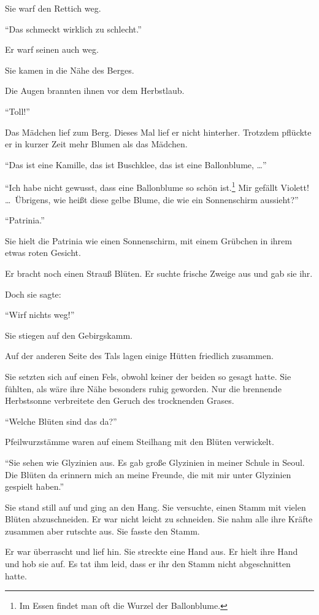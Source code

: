 \documentclass[prd,a4paper,12pt,tightenlines,notitlepage,nofootinbib]{revtex4-1}
\begin{document}
Sie warf den Rettich weg.

"`Das schmeckt wirklich zu schlecht."'

Er warf seinen auch weg.

Sie kamen in die Nähe des Berges.

Die Augen brannten ihnen vor dem Herbstlaub.

"`Toll!"'

Das Mädchen lief zum Berg.  Dieses Mal lief er nicht hinterher.
Trotzdem pflückte er in kurzer Zeit mehr Blumen als das Mädchen.

"`Das ist eine Kamille, das ist Buschklee, das ist eine Ballonblume, \ldots"'

"`Ich habe nicht gewusst, dass eine Ballonblume so schön ist.\footnote{
Im Essen findet man oft die Wurzel der Ballonblume.}
Mir gefällt
Violett!  \ldots\  Übrigens, wie heißt diese gelbe Blume, die wie ein
Sonnenschirm aussieht?"'

"`Patrinia."'

Sie hielt die Patrinia wie einen
Sonnenschirm, mit einem Grübchen in ihrem etwas roten Gesicht.

Er bracht noch einen Strauß Blüten.  Er suchte frische Zweige aus und
gab sie ihr.

Doch sie sagte:

"`Wirf nichts weg!"'

Sie stiegen auf den Gebirgskamm.

Auf der anderen Seite des Tals lagen einige Hütten
friedlich zusammen.

Sie setzten sich auf einen Fels, obwohl keiner der beiden
so gesagt hatte.
Sie fühlten, als wäre ihre Nähe besonders ruhig geworden.
Nur die
brennende Herbstsonne verbreitete den Geruch des trocknenden Grases.

"`Welche Blüten sind das da?"'

Pfeilwurzstämme waren auf einem
Steilhang mit den Blüten verwickelt.

"`Sie sehen wie Glyzinien aus.
Es gab große Glyzinien in meiner Schule in Seoul.  Die Blüten da
erinnern mich an meine Freunde, die mit mir unter Glyzinien gespielt
haben."'

Sie stand still auf und ging an den Hang.  Sie versuchte,
einen Stamm mit vielen Blüten abzuschneiden.  Er war nicht leicht
zu schneiden.  Sie nahm alle ihre Kräfte zusammen aber rutschte aus.
Sie fasste den Stamm.

Er war überrascht und lief hin.  Sie streckte
eine Hand aus.  Er hielt ihre Hand und hob sie auf.  Es tat ihm leid,
dass er ihr den Stamm nicht abgeschnitten hatte.
\end{document}
